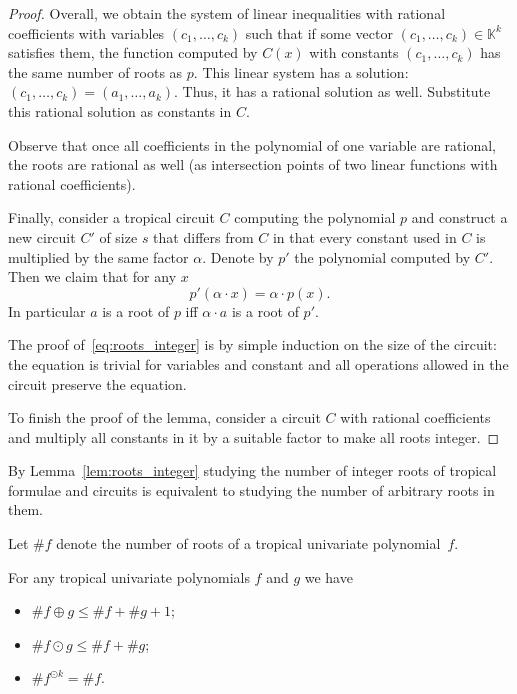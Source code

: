 \documentclass[11pt]{article}
\newcommand{\ta}{\oplus}
\newcommand{\tp}{\odot}
\newcommand{\bb}[1]{\mathbb{#1}}
\begin{document}
\begin{proof}
Overall, we obtain the system of linear inequalities with rational coefficients with variables $(c_1,\ldots, c_k)$ such that if some vector  $(c_1,\ldots, c_k)\in \bb{K}^k$ satisfies them, the function computed by $C(x)$ with constants $(c_1,\ldots, c_k)$ has the same number of roots as $p$. This linear system has a solution: $(c_1,\ldots, c_k)=(a_1,\ldots, a_k)$. Thus, it has a rational solution as well. Substitute this rational solution as constants in $C$.

Observe that once all coefficients in the polynomial of one variable are rational, the roots are rational as well (as intersection points of two linear functions with rational coefficients).

Finally, consider a tropical circuit $C$ computing the polynomial $p$ and construct a new circuit $C'$ of size $s$ that differs from $C$ in that every constant used in $C$ is multiplied by the same factor $\alpha$. Denote by $p'$ the polynomial computed by $C'$. Then we claim that for any $x$ 
\begin{equation} \label{eq:roots_integer}
p'(\alpha \cdot x)=\alpha \cdot p(x).
\end{equation}
In particular $a$ is a root of $p$ iff $\alpha \cdot a$ is a root of $p'$.

The proof of~\eqref{eq:roots_integer} is by simple induction on the size of the circuit: the equation is trivial for variables and constant and all operations allowed in the circuit preserve the equation.

To finish the proof of the lemma, consider a circuit $C$ with rational coefficients and multiply all constants in it by a suitable factor to make all roots integer.
\end{proof}

By Lemma~\ref{lem:roots_integer} studying the number of integer roots of tropical formulae and circuits is equivalent to studying the number of arbitrary roots in them.

Let $\# f$ denote the number of roots of a tropical univariate polynomial~$f$.

\begin{lemma}
For any tropical univariate polynomials $f$ and $g$ we have
\begin{itemize} \label{lem:formula_props}
\item $\# f\ta g \le \# f + \# g +1$;
\item $\# f\tp g \le \# f + \# g$;
\item $\# f^{\tp k} = \# f$.
\end{itemize}
\end{lemma}
\end{document}
